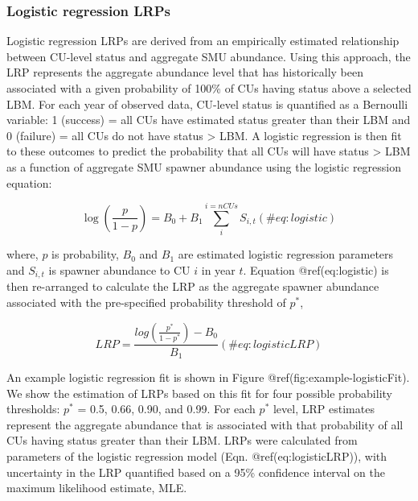 \documentclass[
]{article}
\begin{document}
\hypertarget{logisticMethods}{%
\subsubsection{Logistic regression LRPs}\label{logisticMethods}}

Logistic regression LRPs are derived from an empirically estimated
relationship between CU-level status and aggregate SMU abundance. Using
this approach, the LRP represents the aggregate abundance level that has
historically been associated with a given probability of 100\% of CUs
having status above a selected LBM. For each year of observed data,
CU-level status is quantified as a Bernoulli variable: 1 (success) = all
CUs have estimated status greater than their LBM and 0 (failure) = all
CUs do not have status \textgreater{} LBM. A logistic regression is then
fit to these outcomes to predict the probability that all CUs will have
status \textgreater{} LBM as a function of aggregate SMU spawner
abundance using the logistic regression equation:

\begin{equation}
  \log(\frac{p}{1-p}) = B_0 + B_1 \sum_{i}^{i=nCUs} S_{i,t}
   (\#eq:logistic)
\end{equation}

where, \(p\) is probability, \(B_0\) and \(B_1\) are estimated logistic
regression parameters and \(S_{i,t}\) is spawner abundance to CU \(i\)
in year \(t\). Equation @ref(eq:logistic) is then re-arranged to
calculate the LRP as the aggregate spawner abundance associated with the
pre-specified probability threshold of \(p^*\),

\begin{equation}
  LRP = \frac{log(\frac{p^*}{1-p^*}) - B_0}{B_1}
  (\#eq:logisticLRP)
\end{equation}

An example logistic regression fit is shown in Figure
@ref(fig:example-logisticFit). We show the estimation of LRPs based on
this fit for four possible probability thresholds: \(p^*\) = 0.5, 0.66,
0.90, and 0.99. For each \(p^*\) level, LRP estimates represent the
aggregate abundance that is associated with that probability of all CUs
having status greater than their LBM. LRPs were calculated from
parameters of the logistic regression model (Eqn. @ref(eq:logisticLRP)),
with uncertainty in the LRP quantified based on a 95\% confidence
interval on the maximum likelihood estimate, MLE.
\end{document}
